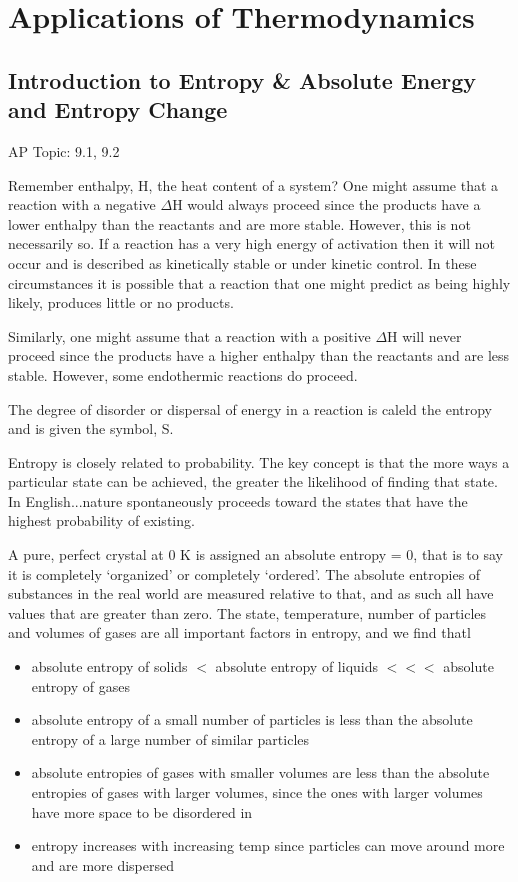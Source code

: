 \documentclass[../chem.tex]{subfiles}
\begin{document}
\chapter{Applications of Thermodynamics}
\section{Introduction to Entropy \& Absolute Energy and Entropy Change}
AP Topic: 9.1, 9.2

Remember enthalpy, H, the heat content of a system? One might assume that a reaction with a negative $\Delta$H would always proceed since the products 
have a lower enthalpy than the reactants and are more stable. However, this is not necessarily so. If a reaction has a very high energy of activation then it 
will not occur and is described as kinetically stable or under kinetic control. In these circumstances it is possible that a reaction that one might predict as being highly likely, produces little or no products.

Similarly, one might assume that a reaction with a positive $\Delta$H will never proceed since the products have a higher enthalpy than the reactants and are less stable. However, some endothermic reactions do proceed.

The degree of disorder or dispersal of energy in a reaction is caleld the entropy and is given the symbol, S.

Entropy is closely related to probability. The key concept is that the more ways a particular state can be achieved, the greater the likelihood 
of finding that state. In English...nature spontaneously proceeds toward the states that have the highest probability of existing.

A pure, perfect crystal at 0 K is assigned an absolute entropy = 0, that is to say it is completely `organized' or completely `ordered'. 
The absolute entropies of substances in the real world are measured relative to that, and as such all have values that are greater than zero. 
The state, temperature, number of particles and volumes of gases are all important factors in entropy, and we find thatl
\begin{center}
    \begin{itemize}
        \item absolute entropy of solids $<$ absolute entropy of liquids $<<<$ absolute entropy of gases
        \item absolute entropy of a small number of particles is less than the absolute entropy of a large number of similar particles 
        \item absolute entropies of gases with smaller volumes are less than the absolute entropies of gases with larger volumes, since the ones with larger volumes have more space to be disordered in
        \item entropy increases with increasing temp since particles can move around more and are more dispersed 
    \end{itemize}
\end{center}
\end{document}
